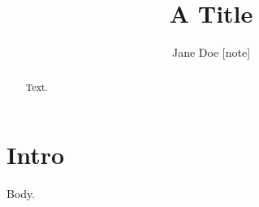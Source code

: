 \documentclass{aastex701}
\begin{document}
\title{A Title}
\author{Jane Doe \newline {}[note]}
\begin{abstract}
Text.
\end{abstract}
\section{Intro} Body.
\end{document}
